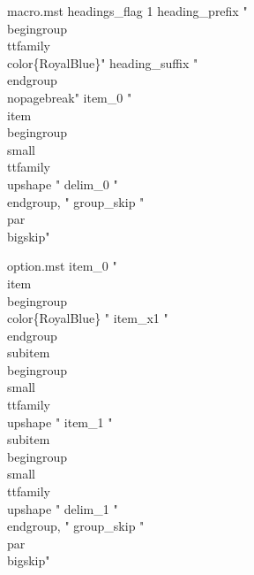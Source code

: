 % 
% 
% 

\begin{filecontents*}{macro.mst}
headings_flag 1
heading_prefix "\\begingroup \\ttfamily \\color\{RoyalBlue\}"
heading_suffix "\\endgroup \\nopagebreak\n"
item_0 "\n \\item \\begingroup \\small \\ttfamily \\upshape "
delim_0 "\\endgroup, "
group_skip "\n\n\\par\\bigskip\n"
\end{filecontents*}

\begin{filecontents*}{option.mst}
item_0 "\n \\item \\begingroup \\color\{RoyalBlue\} "
item_x1 "\\endgroup \n \\subitem \\begingroup \\small \\ttfamily \\upshape "
item_1 "\n \\subitem \\begingroup \\small \\ttfamily \\upshape "
delim_1 "\\endgroup, "
group_skip "\n\n\\par\\bigskip\n"
\end{filecontents*}

